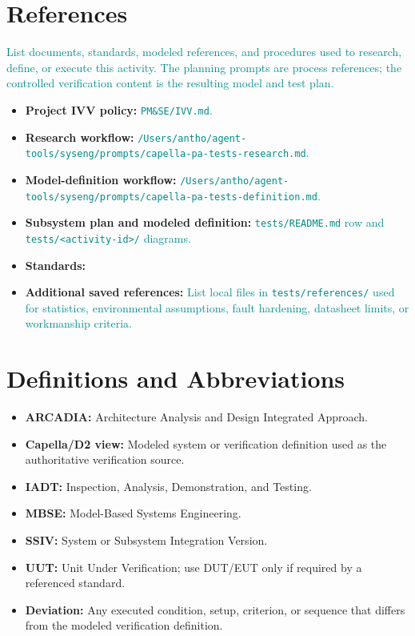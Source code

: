 \documentclass{../common/latex/delta_base_styles/delta_base_styles}
\newcommand{\placeholder}[1]{\textcolor{DarkCyan}{#1}}
\begin{document}
\section{References}
\placeholder{List documents, standards, modeled references, and procedures used to research, define, or execute this activity. The planning prompts are process references; the controlled verification content is the resulting model and test plan.}
\begin{itemize}
  \item \textbf{Project IVV policy:} \placeholder{\texttt{PM\&SE/IVV.md}.}
  \item \textbf{Research workflow:} \placeholder{\texttt{/Users/antho/agent-tools/syseng/prompts/capella-pa-tests-research.md}.}
  \item \textbf{Model-definition workflow:} \placeholder{\texttt{/Users/antho/agent-tools/syseng/prompts/capella-pa-tests-definition.md}.}
  \item \textbf{Subsystem plan and modeled definition:} \placeholder{\texttt{tests/README.md} row and \texttt{tests/<activity-id>/} diagrams.}
  \item \textbf{Standards:}
  \nocite{ISO29119,IEC60068,ISO17025}
  \printbibliography[heading=none]
  \item \textbf{Additional saved references:} \placeholder{List local files in \texttt{tests/references/} used for statistics, environmental assumptions, fault hardening, datasheet limits, or workmanship criteria.}
\end{itemize}

\section{Definitions and Abbreviations}
\begin{itemize}
  \item \textbf{ARCADIA:} Architecture Analysis and Design Integrated Approach.
  \item \textbf{Capella/D2 view:} Modeled system or verification definition used as the authoritative verification source.
  \item \textbf{IADT:} Inspection, Analysis, Demonstration, and Testing.
  \item \textbf{MBSE:} Model-Based Systems Engineering.
  \item \textbf{SSIV:} System or Subsystem Integration Version.
  \item \textbf{UUT:} Unit Under Verification; use DUT/EUT only if required by a referenced standard.
  \item \textbf{Deviation:} Any executed condition, setup, criterion, or sequence that differs from the modeled verification definition.
\end{itemize}
\end{document}
